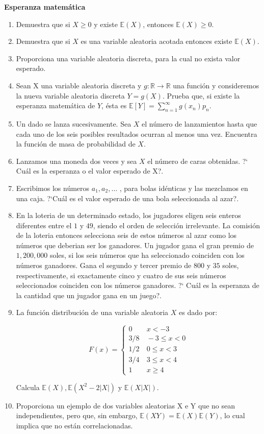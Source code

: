 \documentclass[a4paper,10pt]{report}
\begin{document}
\vspace{0.5cm}

\textbf{Esperanza matem\'atica}
\begin{enumerate}
\item Demuestra que si $X \geq 0$ y existe $\mathbb{E}(X)$, entonces $\mathbb{E}(X) \geq 0$.
\item Demuestra que si  $X$ es una variable aleatoria acotada entonces existe $\mathbb{E}(X)$.
\item Proporciona una variable aleatoria discreta, para la cual no exista valor esperado.
\item Sean X una variable aleatoria discreta y $g : \mathbb{R}\to\mathbb{R}$ una funci\'on y consideremos la nueva variable aleatoria discreta $Y=g(X)$. Prueba que, si existe la esperanza matem\'atica de $Y$, \'esta es $\displaystyle \mathbb{E}[Y]=\sum_{n=1}^{\infty}g(x_n)p_n$.
\item Un dado  se lanza sucesivamente. Sea $X$ el n\'umero de lanzamientos hasta que cada uno de los seis posibles resultados ocurran al menos una vez. Encuentra la funci\'on de masa de probabilidad de $X$.

\item Lanzamos  una moneda  dos veces y sea  $X$  el n\'umero de caras obtenidas. ?` Cu\'al es la esperanza o el valor esperado  de X?.
\item Escribimos los n\'umeros $a_1, a_2, \dots $ , para  bolas id\'enticas y las mezclamos  en una caja. ?`Cu\'al es el valor esperado de una bola seleccionada al azar?.
\item En la loteria de un determinado estado, los jugadores eligen seis enteros diferentes entre el $1$ y $49$, siendo el orden de selecci\'on irrelevante. La comisi\'on de la loteria entonces selecciona seis de estos n\'umeros al azar como los n\'umeros que deberian ser los ganadores. Un jugador gana el gran premio de $1,200,000$ soles, si los seis n\'umeros que ha seleccionado coinciden con los n\'umeros ganadores. Gana el segundo y tercer premio de $800$ y $35$ soles, respectivamente, si exactamente cinco y cuatro de sus seis n\'umeros seleccionados coinciden con los n\'umeros ganadores. ?` Cu\'al es la  esperanza  de la cantidad que un jugador gana en un juego?.

\item La funci\'on distribuci\'on de una variable aleatoria $X$ es dado por:

\[
F(x) = \begin{cases}
0 & \ x < -3 \\
3/8 & \ -3 \leq x < 0 \\
1/2 & \ 0 \leq x < 3 \\
3/4 & \ 3 \leq x < 4 \\
1 & \ x \geq 4
\end{cases}
\]

Calcula $\mathbb{E}(X), \mathbb{E}(X^2 - 2\vert X \vert )$ y $\mathbb{E}(X\vert X \vert)$.
 \item Proporciona  un ejemplo de dos variables aleatorias X e Y que no sean independientes, pero que, sin embargo,
$\mathbb{E}(XY ) = \mathbb{E}(X) \mathbb{E}(Y )$, lo cual implica que no est\'an correlacionadas.
\end{enumerate}
\end{document}
